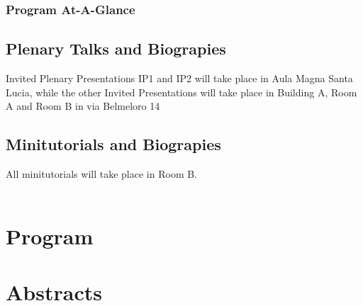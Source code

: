 \documentclass[twoside]{book}
\begin{document}






\usechapterimagetrue
{} %
\pagestyle{empty} %

\tableofcontents %
\cleardoublepage %
\pagestyle{fancy} %

\newpage
\section*{Program At-A-Glance}




\chapter*{Plenary Talks and Biograpies}

{\Large{Invited Plenary Presentations  IP1 and IP2 will take place in Aula Magna Santa Lucia, while the other Invited Presentations will take place in Building A, Room A and Room B in via Belmeloro 14}}



\chapter*{Minitutorials and Biograpies}

{\Large{All minitutorials will take place in Room B.}}\\\\



\part{Program}



\part{Abstracts}
\end{document}
